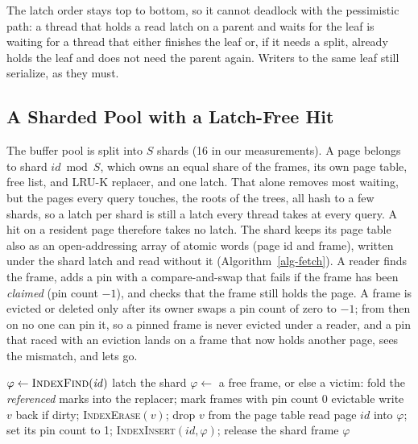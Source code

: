 The latch order stays top to bottom, so it cannot deadlock with the
pessimistic path: a thread that holds a read latch on a parent and waits for
the leaf is waiting for a thread that either finishes the leaf or, if it
needs a split, already holds the leaf and does not need the parent again.
Writers to the same leaf still serialize, as they must.

\subsection{A Sharded Pool with a Latch-Free Hit}

The buffer pool is split into $S$ shards (16 in our measurements).
A page belongs to shard $\mathit{id} \bmod S$, which owns an equal share of the
frames, its own page table, free list, and LRU-K replacer, and one latch.
That alone removes most waiting, but the pages every query touches, the roots
of the trees, all hash to a few shards, so a latch per shard is still a latch
every thread takes at every query.
A hit on a resident page therefore takes no latch.
The shard keeps its page table also as an open-addressing array of atomic
words (page id and frame), written under the shard latch and read without it
(Algorithm~\ref{alg-fetch}).
A reader finds the frame, adds a pin with a compare-and-swap that fails if the
frame has been \emph{claimed} (pin count $-1$), and checks that the frame still
holds the page.
A frame is evicted or deleted only after its owner swaps a pin count of
zero to $-1$; from then on no one can pin it, so a pinned frame is never
evicted under a reader, and a pin that raced with an eviction lands on a frame
that now holds another page, sees the mismatch, and lets go.

\begin{algorithm}[t]
\caption{\textsc{Fetch}$(\mathit{id})$ in a shard, and the claim that guards eviction}\label{alg-fetch}
\small
$\varphi \gets \textsc{IndexFind}(\mathit{id})$ 
latch the shard\;
$\varphi \gets$ a free frame, or else a victim:\;
\quad fold the \emph{referenced} marks into the replacer; mark frames with pin count 0 evictable\;
\quad {}\;
\quad write $v$ back if dirty; \textsc{IndexErase}$(v)$; drop $v$ from the page table\;
read page $\mathit{id}$ into $\varphi$; set its pin count to 1; \textsc{IndexInsert}$(\mathit{id}, \varphi)$; release the shard\;
\Return frame $\varphi$\;
\end{algorithm}


